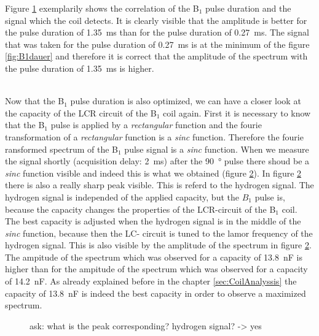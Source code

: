 Figure \ref{fig:pulsedurationbeispiel} exemplarily shows the correlation of the B$_1$ pulse duration and the signal which the coil detects. It is clearly visible that the amplitude is better for the pulse duration of \SI{1.35}{\milli \second} than for the pulse duration of \SI{0.27}{\milli \second}. The signal that was taken for the pulse duration of \SI{0.27}{\milli \second} is at the minimum of the figure \ref{fig:B1dauer} and therefore it is correct that the amplitude of the spectrum with the pulse duration of \SI{1.35}{\milli \second} is higher.
\begin{figure}[H]
    \centering
    
    \caption[]{}
    \label{fig:pulsedurationbeispiel}
\end{figure}
\\
Now that the B$_1$ pulse duration is also optimized, we can have a closer look at the capacity of the LCR circuit of the B$_1$ coil again. First it is necessary to know that the B$_1$ pulse is applied by a \textit{rectangular} function and the fourie transformation of a \textit{rectangular} function is a \textit{sinc} function. Therefore the fourie ransformed spectrum of the B$_1$ pulse signal is a \textit{sinc} function. When we measure the signal shortly (acquisition delay: \SI{2}{\milli \second}) after the \SI{90}{\degree} pulse there shoud be a \textit{sinc} function visible and indeed this is what we obtained (figure \ref{fig:Pulsandcollect}). In figure \ref{fig:Pulsandcollect} there is also a really sharp peak visible. This is referd to the hydrogen signal. The hydrogen signal is independed of the applied capacity, but the $B_1$ pulse is, because the capacity changes the properties of the LCR-circuit of the B$_1$ coil. The best capacity is adjusted when the hydrogen signal is in the middle of the \textit{sinc} function, because then the LC- circuit is tuned to the lamor frequency of the hydrogen signal. This is also visible by the amplitude of the spectrum in figure \ref{fig:Pulsandcollect}. The ampitude of the spectrum which was observed for a capacity of \SI{13.8}{\nano \farad} is higher than for the ampitude of the spectrum which was observed for a capacity of \SI{14.2}{\nano \farad}. As already explained before in the chapter \ref{sec:CoilAnalyssis} the capacity of \SI{13.8}{\nano \farad} is indeed the best capacity in order to observe a maximized spectrum.
\begin{figure}[H]
    \centering
    
    \caption[]{ask: what is the peak corresponding? hydrogen signal? -> yes}
    \label{fig:Pulsandcollect}
\end{figure}
